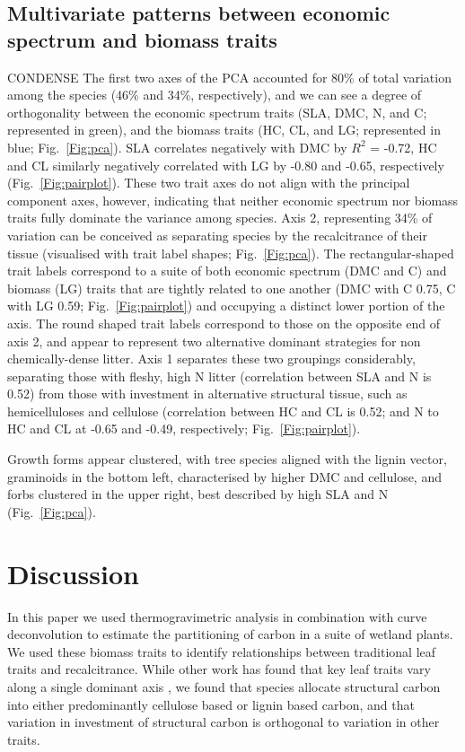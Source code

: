 \documentclass{article}
\begin{document}
\subsection{Multivariate patterns between economic spectrum and biomass traits}
CONDENSE
The first two axes of the PCA accounted for 80\% of total variation among the species (46\% and 34\%, respectively), and we can see a degree of orthogonality between the economic spectrum traits (SLA, DMC, N, and C; represented in green), and the biomass traits (HC, CL, and LG; represented in blue; Fig.~\ref{Fig:pca}). SLA correlates negatively with DMC by $R^2$ = -0.72, HC and CL similarly negatively correlated with LG by -0.80 and -0.65, respectively (Fig.~\ref{Fig:pairplot}). These two trait axes do not align with the principal component axes, however, indicating that neither economic spectrum nor biomass traits fully dominate the variance among species. Axis 2, representing 34\% of variation can be conceived as separating species by the recalcitrance of their tissue (visualised with trait label shapes; Fig.~\ref{Fig:pca}). The rectangular-shaped trait labels correspond to a suite of both economic spectrum (DMC and C) and biomass (LG) traits that are tightly related to one another (DMC with C 0.75, C with LG 0.59; Fig.~\ref{Fig:pairplot}) and occupying a distinct lower portion of the axis. The round shaped trait labels correspond to those on the opposite end of axis 2, and appear to represent two alternative dominant strategies for non chemically-dense litter. Axis 1 separates these two groupings considerably, separating those with fleshy, high N litter (correlation between SLA and N is 0.52) from those with investment in alternative structural tissue, such as hemicelluloses and cellulose (correlation between HC and CL is 0.52; and N to HC and CL at -0.65 and -0.49, respectively; Fig.~\ref{Fig:pairplot}). 

Growth forms appear clustered, with tree species aligned with the lignin vector, graminoids in the bottom left, characterised by higher DMC and cellulose, and forbs clustered in the upper right, best described by high SLA and N (Fig.~\ref{Fig:pca}). 

\section{Discussion}
In this paper we used thermogravimetric analysis in combination with curve deconvolution to estimate the partitioning of carbon in a suite of wetland plants. We used these biomass traits to identify relationships between traditional leaf traits and recalcitrance. While other work has found that key leaf traits vary along a single dominant axis \citep{wright2005}, we found that species allocate structural carbon into either predominantly cellulose based or lignin based carbon, and that variation in investment of structural carbon is orthogonal to variation in other traits. 
\end{document}
